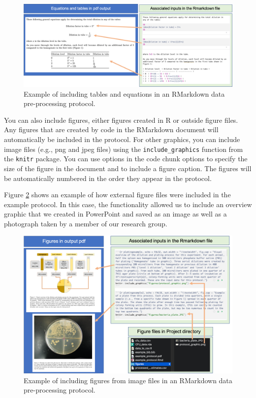 \documentclass[]{tufte-book}
\begin{document}
\begin{figure}
\includegraphics[width=\textwidth]{figures/protocol_equations_tables} \caption[Example of including tables and equations in an RMarkdown data pre-processing protocol]{Example of including tables and equations in an RMarkdown data pre-processing protocol.}\label{fig:protocolequations}
\end{figure}

You can also include figures, either figures created in R or outside figure files.
Any figures that are created by code in the RMarkdown document will automatically
be included in the protocol. For other graphics, you can include image files
(e.g., png and jpeg files) using the \texttt{include\_graphics} function from the
\texttt{knitr} package. You can use options in the code chunk options to specify
the size of the figure in the document and to include a figure caption. The
figures will be automatically numbered in the order they appear in the protocol.

Figure \ref{fig:protocolfigures} shows an example of how external figure
files were included in the example protocol. In this case, the functionality
allowed us to include an overview graphic that we created in PowerPoint and
saved as an image as well as a photograph taken by a member of our research
group.

\begin{figure}
\includegraphics[width=\textwidth]{figures/protocol_figures} \caption[Example of including figures from image files in an RMarkdown data pre-processing protocol]{Example of including figures from image files in an RMarkdown data pre-processing protocol.}\label{fig:protocolfigures}
\end{figure}
\end{document}
